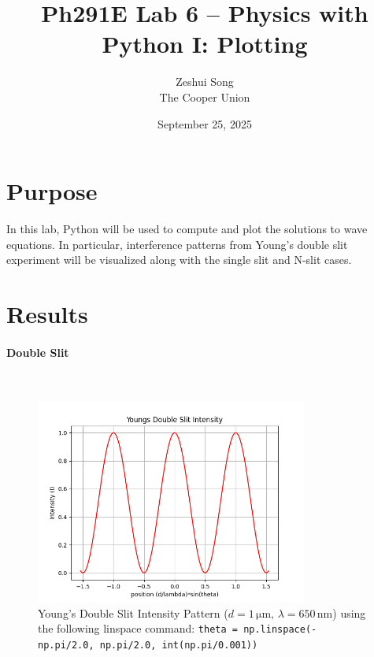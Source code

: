 \documentclass[12pt]{article}
\title{Ph291E Lab 6 -- Physics with Python I: Plotting}
\author{
    Zeshui Song\\
    The Cooper Union
}
\date{September 25, 2025}
\begin{document}
\maketitle

\section{Purpose}  
In this lab, Python will be used to compute and plot the solutions to wave equations. In particular, interference patterns from Young's double slit experiment will be visualized along with the single slit and N-slit cases.
\newpage
\section{Results}
\paragraph{Double Slit}\mbox{}\\
\begin{figure}[H]
    \centering
    \includegraphics[width=0.8\textwidth]{youngs_ds.png}
\caption{Young's Double Slit Intensity Pattern ($d=1\,\mathrm{\mu m},\,\lambda=650\,\mathrm{nm}$) using the following linspace command: \texttt{theta = np.linspace(-np.pi/2.0, np.pi/2.0, int(np.pi/0.001))}}
\end{figure}
\end{document}
